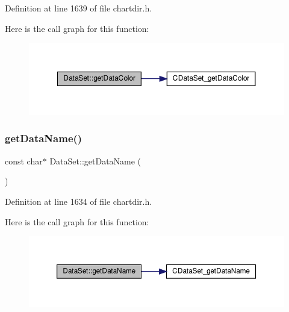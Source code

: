 Definition at line 1639 of file chartdir.\+h.

Here is the call graph for this function\+:
\nopagebreak
\begin{figure}[H]
\begin{center}
\leavevmode
\includegraphics[width=350pt]{class_data_set_a7b870af5d707224a3a9953c5362ab0bf_cgraph}
\end{center}
\end{figure}
\mbox{\label{class_data_set_aad74ac46262111ed71cf8811606f5b78}} 
\subsubsection{\texorpdfstring{get\+Data\+Name()}{getDataName()}}
{\footnotesize\ttfamily const char$\ast$ Data\+Set\+::get\+Data\+Name (\begin{DoxyParamCaption}{ }\end{DoxyParamCaption})\hspace{0.3cm}{\ttfamily [inline]}}



Definition at line 1634 of file chartdir.\+h.

Here is the call graph for this function\+:
\nopagebreak
\begin{figure}[H]
\begin{center}
\leavevmode
\includegraphics[width=350pt]{class_data_set_aad74ac46262111ed71cf8811606f5b78_cgraph}
\end{center}
\end{figure}
\mbox{\label{class_data_set_a4901f101afedfe65f10d2a28817ffafd}} 
